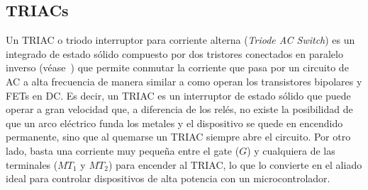 %
%


\subsection{TRIACs}%
\label{seq:intro-triac}

Un TRIAC o triodo interruptor para corriente alterna (\emph{Triode AC Switch}) es un integrado de estado sólido compuesto por dos tristores conectados en paralelo inverso (véase~) que permite conmutar la corriente que pasa por un circuito de AC a alta frecuencia de manera similar a como operan los transistores bipolares y FETs en DC.
Es decir, un TRIAC es un interruptor de estado sólido que puede operar a gran velocidad que, a diferencia de los relés, no existe la posibilidad de que un arco eléctrico funda los metales y el dispositivo se quede en encendido permanente, sino que al quemarse un TRIAC siempre abre el circuito.
Por otro lado, basta una corriente muy pequeña entre el gate ($G$) y cualquiera de las terminales ($MT_1$ y $MT_2$) para encender al TRIAC, lo que lo convierte en el aliado ideal para controlar dispositivos de alta potencia con un microcontrolador.

